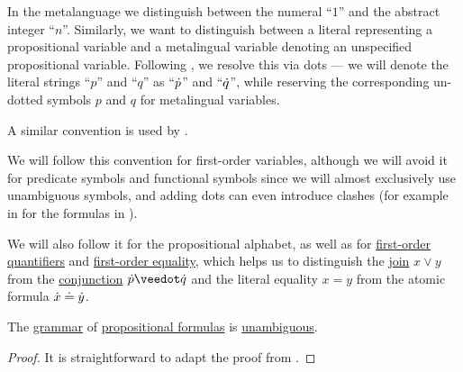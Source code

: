 \begin{remark}\label{rem:object_language_dots}
  In the metalanguage we distinguish between the numeral \enquote{\( 1 \)} and the abstract integer \enquote{\( n \)}. Similarly, we want to distinguish between a literal representing a propositional variable and a metalingual variable denoting an unspecified propositional variable. Following , we resolve this via dots --- we will denote the literal strings \enquote{\( p \)} and \enquote{\( q \)} as \enquote{\( {\dot{p}} \)} and \enquote{\( \dot{q} \)}, while reserving the corresponding un-dotted symbols \( p \) and \( q \) for metalingual variables.

  A similar convention is used by .

  We will follow this convention for first-order variables, although we will avoid it for predicate symbols and functional symbols since we will almost exclusively use unambiguous symbols, and adding dots can even introduce clashes (for example in for the formulas in ).

  We will also follow it for the propositional alphabet, as well as for \hyperref[def:first_order_language/quantifiers]{first-order quantifiers} and \hyperref[def:first_order_language/equality]{first-order equality}, which helps us to distinguish the \hyperref[def:lattice/join]{join} \( x \vee y \) from the \hyperref[def:propositional_alphabet/connectives/conjunction]{conjunction} \( \syn p \synvee \syn q \) and the literal equality \( x = y \) from the atomic formula \( \dot{x} \doteq \dot{y} \).
\end{remark}

\begin{proposition}\label{thm:propositional_formulas_are_unambiguous}
  The \hyperref[def:formal_grammar]{grammar} of \hyperref[def:propositional_syntax/formula]{propositional formulas} is \hyperref[def:grammar_ambiguity]{unambiguous}.
\end{proposition}
\begin{proof}
  It is straightforward to adapt the proof from .
\end{proof}

